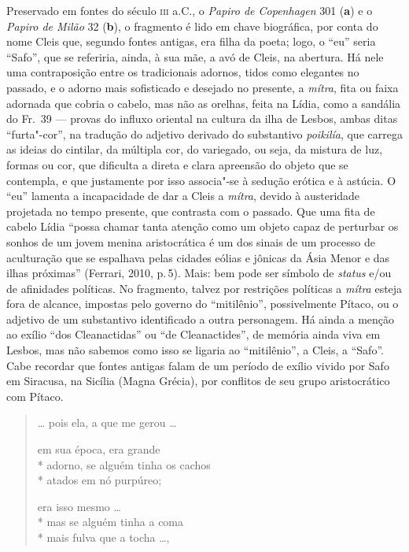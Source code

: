 {{\small Preservado em fontes do século \textsc{iii} a.C., o \textit{Papiro de Copenhagen} 301 (\textbf{a}) e o \textit{Papiro de Milão} 32 (\textbf{b}),
o fragmento é lido em chave biográfica, por conta do
nome Cleis que, segundo fontes antigas, era filha da poeta; logo, o “eu” seria
``Safo”, que se referiria, ainda, à sua mãe, a avó de Cleis, na
abertura. Há nele uma contraposição entre os tradicionais adornos, tidos como		\EP[]
elegantes no passado, e o adorno mais sofisticado e desejado no presente, a
\textit{mítra}, fita ou faixa adornada que cobria o cabelo, mas não as orelhas,
feita na Lídia, como a sandália do Fr.~39 --- provas do influxo oriental na
cultura da ilha de Lesbos, ambas ditas ``furta"-cor”, na tradução do
adjetivo derivado do substantivo \textit{poikilía}, que carrega as ideias do
cintilar, da múltipla cor, do variegado, ou seja, da mistura de luz, formas ou
cor, que dificulta a direta e clara apreensão do objeto que se contempla, e que
justamente por isso associa"-se à sedução erótica e à astúcia. O “eu” lamenta a
incapacidade de dar a Cleis a \textit{mítra}, devido à austeridade projetada no tempo presente, que contrasta com o passado. Que uma fita de cabelo Lídia “possa chamar tanta atenção como um objeto capaz de perturbar os sonhos de um jovem menina aristocrática é um dos sinais de um processo de aculturação que se espalhava pelas cidades eólias e jônicas da Ásia Menor e das ilhas próximas” (Ferrari, 2010, p.\,5). Mais: bem pode ser símbolo de \textit{status} e/ou de afinidades políticas. No fragmento, talvez por restrições políticas a \textit{mítra} esteja fora de alcance,  impostas pelo governo do “mitilênio”, possivelmente
Pítaco, ou o adjetivo de um substantivo identificado a outra personagem. Há
ainda a menção ao exílio “dos Cleanactidas” ou “de Cleanactides”, de memória
ainda viva em Lesbos, mas não sabemos como isso se ligaria ao
“mitilênio”, a Cleis, a ``Safo”. Cabe recordar que fontes antigas falam
de um período de exílio vivido por Safo em Siracusa, na Sicília (Magna Grécia),
por conflitos de seu grupo aristocrático com Pítaco.}

\pagebreak

\begin{verse}
\ldots{} pois ela, a que me gerou \ldots{}


em sua época, era grande \\*
adorno, se alguém tinha os cachos\\*
atados em nó purpúreo;


era isso mesmo \ldots{} \\*
mas se alguém tinha a coma\\*
mais fulva que a tocha \ldots{},


\end{verse}}
